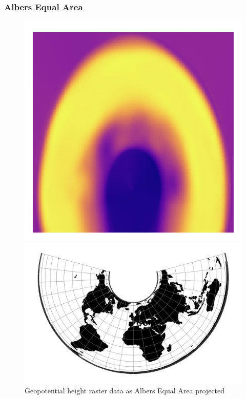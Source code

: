 \subsubsection*{Albers Equal Area}
\begin{figure}[h]
    \centering
    \begin{minipage}{0.30\textwidth}
        \centering
        \includegraphics[width=0.9\linewidth]{figures/chapter-8/geopoth_aea.png}
        \caption{ Geopotential height raster data as Albers Equal Area projected}
        \label{fig:aea_geopoth_raster}
    \end{minipage}\hfill
    \begin{minipage}{0.30\textwidth}
        \centering
        \includegraphics[width=0.9\linewidth]{figures/chapter-8/aea.png}

\end{minipage}
\end{figure}
